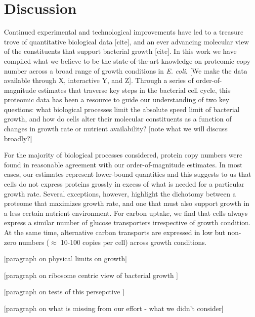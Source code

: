 \section{Discussion}
Continued experimental and technological improvements have led to a treasure
trove of quantitative biological data [cite], and an ever advancing molecular
view of the constituents that support bacterial growth [cite]. In this work we
have compiled what we believe to be the state-of-the-art knowledge on proteomic
copy number across a broad range of growth conditions in \textit{E. coli}. [We
make the data available through X, interactive Y, and Z]. Through a series of
order-of-magnitude estimates that traverse key steps in the bacterial cell
cycle, this proteomic data has been a resource to guide our understanding of two
key questions: what biological processes limit the absolute speed limit of
bacterial growth, and how do cells alter their  molecular constituents as a
function of changes in growth rate or nutrient availability?
[note what we will discuss broadly?]

For the majority of biological processes considered, protein copy numbers were
found in reasonable agreement with our order-of-magnitude estimates. In most
cases, our estimates represent lower-bound quantities and  this suggests  to us that
cells do not express proteins grossly in excess of what is needed for a
particular growth rate. Several exceptions, however, highlight the
dichotomy between a proteome that maximizes growth rate, and one that must also
support growth in a less certain nutrient environment. For carbon uptake, we
find that cells always express a similar number of glucose transporters irrespective of
growth condition.
At the same time, alternative  carbon transports are expressed in low
but non-zero numbers ($\approx$ 10-100 copies per cell) across growth
conditions.

[paragraph on physical limits on growth]

[paragraph on ribosome centric view of bacterial growth ]

[paragraph on tests of this persepctive ]

[paragraph on what is missing from our effort - what we didn't consider]

%
%
%
%
%
%


